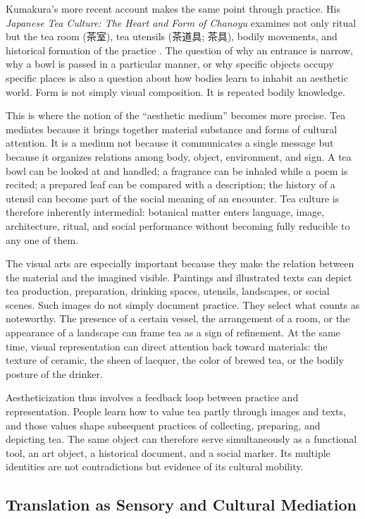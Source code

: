 \documentclass[numbers]{IntechOpen-Book}
\newcommand{\zh}[1]{{\CJKfontspec{Noto Serif CJK SC}\upshape #1}}
\newcommand{\jp}[1]{{\CJKfontspec{Noto Serif CJK JP}\upshape #1}}
\begin{document}
Kumakura's more recent account makes the same point through practice. His \textit{Japanese Tea Culture: The Heart and Form of Chanoyu} examines not only ritual but the tea room (\jp{茶室}), tea utensils (\jp{茶道具}; \zh{茶具}), bodily movements, and historical formation of the practice \cite{kumakura}. The question of why an entrance is narrow, why a bowl is passed in a particular manner, or why specific objects occupy specific places is also a question about how bodies learn to inhabit an aesthetic world. Form is not simply visual composition. It is repeated bodily knowledge.

This is where the notion of the ``aesthetic medium'' becomes more precise. Tea mediates because it brings together material substance and forms of cultural attention. It is a medium not because it communicates a single message but because it organizes relations among body, object, environment, and sign. A tea bowl can be looked at and handled; a fragrance can be inhaled while a poem is recited; a prepared leaf can be compared with a description; the history of a utensil can become part of the social meaning of an encounter. Tea culture is therefore inherently intermedial: botanical matter enters language, image, architecture, ritual, and social performance without becoming fully reducible to any one of them.

The visual arts are especially important because they make the relation between the material and the imagined visible. Paintings and illustrated texts can depict tea production, preparation, drinking spaces, utensils, landscapes, or social scenes. Such images do not simply document practice. They select what counts as noteworthy. The presence of a certain vessel, the arrangement of a room, or the appearance of a landscape can frame tea as a sign of refinement. At the same time, visual representation can direct attention back toward materials: the texture of ceramic, the sheen of lacquer, the color of brewed tea, or the bodily posture of the drinker.

Aestheticization thus involves a feedback loop between practice and representation. People learn how to value tea partly through images and texts, and those values shape subsequent practices of collecting, preparing, and depicting tea. The same object can therefore serve simultaneously as a functional tool, an art object, a historical document, and a social marker. Its multiple identities are not contradictions but evidence of its cultural mobility.

\subsection{Translation as Sensory and Cultural Mediation}
\end{document}
